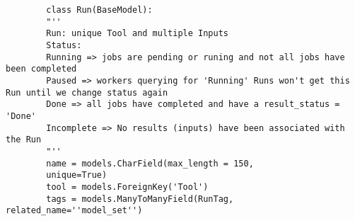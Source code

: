 \documentclass[10pt]{article}
\begin{document}
	\begin{verbatim}
		class Run(BaseModel):
		"''
		Run: unique Tool and multiple Inputs
		Status:
		Running => jobs are pending or runing and not all jobs have been completed
		Paused => workers querying for 'Running' Runs won't get this Run until we change status again
		Done => all jobs have completed and have a result_status = 'Done'
		Incomplete => No results (inputs) have been associated with the Run
		"'' 
		name = models.CharField(max_length = 150,
		unique=True)
		tool = models.ForeignKey('Tool')
		tags = models.ManyToManyField(RunTag, related_name=''model_set'')
	\end{verbatim}
\end{document}
